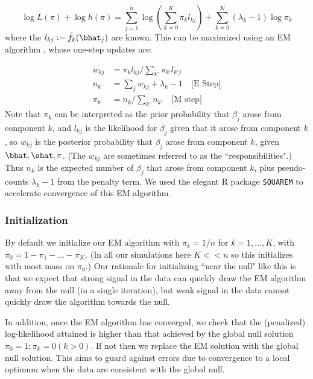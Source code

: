 \begin{equation}
\log L(\pi) + \log h(\pi) = \sum_{j=1}^n \log(\sum_{k=0}^K \pi_k l_{kj}) + \sum_{k=0}^K (\lambda_k-1) \log \pi_k
\end{equation}
where the $l_{kj}:= \tilde{f}_k(\bhat_j)$ are known. This can be maximized using an EM algorithm \cite{dempster77}, whose
one-step updates are:

\begin{align}
\label{eqn:w}
w_{kj} & = \pi_k l_{kj} / \sum_{k'} {\pi_{k'} l_{k'j}} \\
n_k & = \sum_j w_{kj} + \lambda_k - 1 \quad \text{[E Step]} \\
\pi_k &= n_k/\sum_{k'} n_{k'} \quad \text{[M step]}
\end{align}
Note that $\pi_k$ can be interpreted as the prior probability that $\beta_j$ arose from component $k$,
and $l_{kj}$ is the likelihood for $\beta_j$ given that it arose from component $k$, so $w_{kj}$ is the posterior 
probability that $\beta_j$ arose from component $k$, given $\bhat, \shat, \pi$. (The $w_{kj}$ are sometimes referred to as the ``responsibilities".)
Thus $n_k$ is the expected number of $\beta_j$ that arose from component $k$, plus pseudo-counts $\lambda_k-1$ from the penalty term.
We used the elegant R package {\tt SQUAREM} \cite{varadhan2008simple} to accelerate convergence of this EM algorithm.

\subsubsection*{Initialization}

By default we initialize our EM algorithm with $\pi_k=1/n$ for $k=1,\dots,K$, with $\pi_0=1-\pi_1-\dots-\pi_K$. (In all our simulations here $K<<n$ so this initializes with most mass on $\pi_0$.)  
Our rationale for initializing ``near the null" like this is that we expect that strong signal in the data can quickly draw the EM algorithm away from the null (in a single iteration),
but weak signal in the data cannot quickly draw the algorithm towards the null.

In addition, once the EM algorithm has converged, we check that the (penalized) log-likelihood attained is higher than that achieved by the global null solution
$\pi_0=1; \pi_k=0 (k>0)$. If not then we replace the EM solution with the global null solution. This aims to guard against errors due to convergence to a local optimum when the
data are consistent with the global null.

